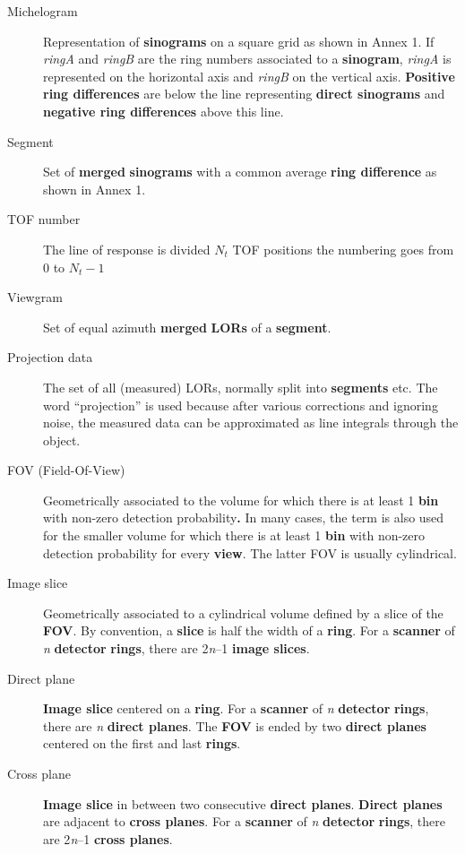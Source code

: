 \documentclass{article}
\begin{document}
\begin{description}
\item[Michelogram] 
Representation of \textbf{sinograms} on a square grid as shown in 
Annex 1. If \textit{ringA} and \textit{ringB} are the ring numbers associated 
to a \textbf{sinogram}, \textit{ringA} is represented on the horizontal 
axis and \textit{ringB} on the vertical axis. \textbf{Positive ring differences} 
are below the line representing \textbf{direct sinograms} and \textbf{negative 
ring differences} above this line.

\item[Segment] 
Set of \textbf{merged} \textbf{sinograms} with a common average \textbf{ring 
difference} as shown in Annex 1.

\item[TOF number] 
The line of response is divided $N_t$ TOF positions the numbering goes from 0 to $N_t -1$

\item[Viewgram] 
Set of equal azimuth \textbf{merged} \textbf{LORs} of a \textbf{segment}.

\item[Projection data]
The set of all (measured) LORs, normally split into \textbf{segments} etc.
The word ``projection'' is used because after various corrections and
ignoring noise, the measured data can be approximated as line integrals 
through the object.
\item[FOV (Field-Of-View)] 
Geometrically associated to the volume for which there is at 
least 1 \textbf{bin} with non-zero detection probability\textbf{.} In many 
cases, the term is also used for the smaller volume for which 
there is at least 1 \textbf{bin} with non-zero detection probability 
for every \textbf{view}. The latter FOV is usually cylindrical.

\item[Image slice] 
Geometrically associated to a cylindrical volume defined by 
a slice of the \textbf{FOV}. By convention, a \textbf{slice} is half the 
width of a \textbf{ring}. For a \textbf{scanner} of \textit{n} \textbf{detector} \textbf{rings}, 
there are 2\textit{n}--1 \textbf{image slices}.

\item[Direct plane] 
\textbf{Image slice} centered on a \textbf{ring}. For a \textbf{scanner} of \textit{n} \textbf{detector} \textbf{rings}, 
there are \textit{n} \textbf{direct planes}. The \textbf{FOV} is ended by two \textbf{direct 
planes} centered on the first and last \textbf{rings}.

\item[Cross plane] 
\textbf{Image slice} in between two consecutive \textbf{direct planes}. \textbf{Direct 
planes} are adjacent to \textbf{cross planes}. For a \textbf{scanner} of \textit{n} \textbf{detector} \textbf{rings}, 
there are 2\textit{n}--1 \textbf{cross planes}.
\end{description}
\end{document}
